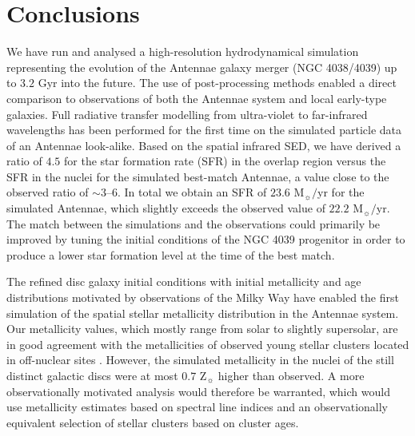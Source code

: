 \documentclass[a4paper,fleqn,usenatbib]{mnras}
\begin{document}
\section{Conclusions}

We have run and analysed a high-resolution hydrodynamical simulation representing the evolution of the 
Antennae galaxy merger (NGC 4038/4039) up to $3.2$ Gyr into the future. 
The use of post-processing methods enabled a direct comparison to observations of both the Antennae system and
local early-type galaxies. Full radiative transfer modelling from ultra-violet to far-infrared wavelengths has been
performed for the first time on the simulated particle data of an Antennae look-alike.
Based on the spatial infrared SED, we have derived a ratio of $4.5$ for the star formation rate (SFR) in the overlap region
versus the SFR in the nuclei for the simulated best-match Antennae, a value close to the observed ratio of $\sim 3$--$6$.
In total we obtain an SFR of $23.6$ M$_{\sun}/$yr for the simulated Antennae, which
slightly exceeds the observed value of $22.2$ M$_{\sun}/$yr.
The match between the simulations and the observations could primarily be improved by tuning the initial conditions of the
NGC 4039 progenitor in order to produce a lower star formation level at the time of the best match.

The refined disc galaxy initial conditions with initial metallicity and age distributions motivated by observations of
the Milky Way have enabled the first simulation of the spatial stellar metallicity distribution in the Antennae system.
Our metallicity values, which mostly range from solar to slightly supersolar, are in good agreement with the metallicities
of observed young stellar clusters located in off-nuclear sites \citet{2009ApJ...701..607B,2015ApJ...812..160L}. However, the simulated
metallicity in the nuclei of the still distinct galactic discs were at most $0.7$ Z$_{\sun}$ higher than observed. 
A more observationally motivated analysis would therefore be warranted, which would use metallicity estimates based on spectral line indices 
and an observationally equivalent selection of stellar clusters based on cluster ages.
\end{document}
